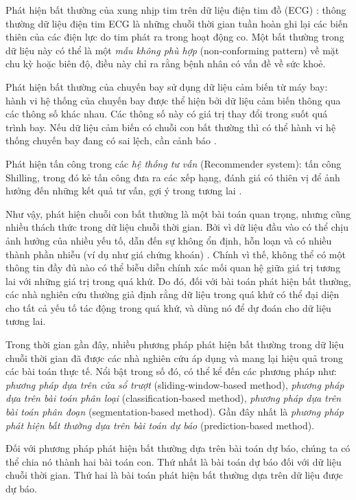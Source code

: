 Phát hiện bất thường của xung nhịp tim trên dữ liệu điện tim đồ (ECG) \cite{st2} \cite{st12}: thông thường dữ liệu điện tim ECG là những chuỗi thời gian tuần hoàn ghi lại các biến thiên của các điện lực do tim phát ra trong hoạt động co. Một bất thường trong dữ liệu này có thể là một \textit{mẫu không phù hợp} (non-conforming pattern) về mặt chu kỳ hoặc biên độ, điều này chỉ ra rằng bệnh nhân có vấn đề về sức khoẻ.

Phát hiện bất thường của chuyến bay sử dụng dữ liệu cảm biến từ máy bay: hành vi hệ thống của chuyến bay được thể hiện bởi dữ liệu cảm biến thông qua các thông số khác nhau. Các thông số này có giá trị thay đổi trong suốt quá trình bay. Nếu dữ liệu cảm biến có chuỗi con bất thường thì có thể hành vi hệ thống chuyến bay đang có sai lệch, cần cảnh báo \cite{st3}.

Phát hiện tấn công trong các \textit{hệ thống tư vấn} (Recommender system): tấn công Shilling, trong đó kẻ tấn công đưa ra các xếp hạng, đánh giá có thiên vị để ảnh hưởng đến những kết quả tư vấn, gợi ý trong tương lai \cite{st4}.

Như vậy, phát hiện chuỗi con bất thường là một bài toán quan trọng, nhưng cũng nhiều thách thức trong dữ liệu chuỗi thời gian. Bởi vì dữ liệu đầu vào có thể chịu ảnh hưởng của nhiều yếu tố, dẫn đến sự không ổn định, hỗn loạn và có nhiều thành phần nhiễu (ví dụ như giá chứng khoán) \cite{st5}. Chính vì thế, không thể có một thông tin đầy đủ nào có thể biễu diễn chính xác mối quan hệ giữa giá trị tương lai với những giá trị trong quá khứ. Do đó, đối với bài toán phát hiện bất thường, các nhà nghiên cứu thường giả định rằng dữ liệu trong quá khứ có thể đại diện cho tất cả yếu tố tác động trong quá khứ, và dùng nó để dự đoán cho dữ liệu tương lai.

Trong thời gian gần đây, nhiều phương pháp phát hiện bất thường trong dữ liệu chuỗi thời gian đã được các nhà nghiên cứu áp dụng và mang lại hiệu quả trong các bài toán thực tế. Nổi bật trong số đó, có thể kể đến các phương pháp như: \textit{phương pháp dựa trên cửa sổ trượt} (sliding-window-based method), \textit{phương pháp dựa trên bài toán phân loại} (classification-based method), \textit{phương pháp dựa trên bài toán phân đoạn} (segmentation-based method). Gần đây nhất là \textit{phương pháp phát hiện bất thường dựa trên bài toán dự báo} (prediction-based method).

Đối với phương pháp phát hiện bất thường dựa trên bài toán dự báo, chúng ta có thể chia nó thành hai bài toán con. Thứ nhất là bài toán dự báo đối với dữ liệu chuỗi thời gian. Thứ hai là bài toán phát hiện bất thường dựa trên dữ liệu được dự báo.

